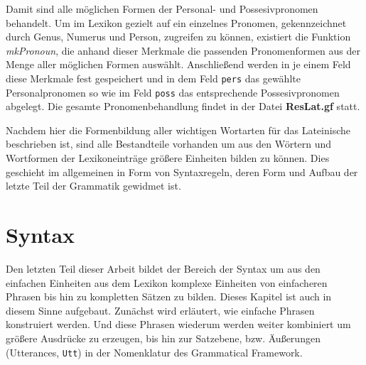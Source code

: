 \documentclass[fontsize=12pt,abstract=on,titlepage,bibliography=totoc,ngerman,listof=totoc]{scrreprt}
\begin{document}
Damit sind alle möglichen Formen der Personal- und Possesivpronomen behandelt. Um im Lexikon gezielt auf ein einzelnes Pronomen, gekennzeichnet durch Genus, Numerus und Person, zugreifen zu können, existiert die Funktion \textit{mkPronoun}, die anhand dieser Merkmale die passenden Pronomenformen aus der Menge aller möglichen Formen auswählt. Anschließend werden in je einem Feld diese Merkmale fest gespeichert und in dem Feld \texttt{pers} das gewählte Personalpronomen so wie im Feld \texttt{poss} das entsprechende Possesivpronomen abgelegt. Die gesamte Pronomenbehandlung findet in der Datei \textbf{ResLat.gf} statt. \par
Nachdem hier die Formenbildung aller wichtigen Wortarten für das Lateinische beschrieben ist, sind alle Bestandteile vorhanden um aus den Wörtern und Wortformen der Lexikoneinträge größere Einheiten bilden zu können. Dies geschieht im allgemeinen in Form von Syntaxregeln, deren Form und Aufbau der letzte Teil der Grammatik gewidmet ist.
\pagebreak
\section{Syntax}
\label{sec:syntax}
Den letzten Teil dieser Arbeit bildet der Bereich der Syntax um aus den einfachen Einheiten aus dem Lexikon komplexe Einheiten von einfacheren Phrasen bis hin zu kompletten Sätzen zu bilden. Dieses Kapitel ist auch in diesem Sinne aufgebaut. Zunächst wird erläutert, wie einfache Phrasen konstruiert werden. Und diese Phrasen wiederum werden weiter kombiniert um größere Ausdrücke zu erzeugen, bis hin zur Satzebene, bzw. Äußerungen (Utterances, \texttt{Utt}) in der Nomenklatur des Grammatical Framework.
\end{document}
